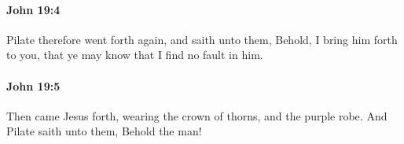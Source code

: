 		\paragraph{John 19:4} %
			\label{JOHN-19-4}

			Pilate therefore went forth again, and saith unto them, Behold, I bring him forth to you, that ye may know that I find no fault in him.

			\begin{framed}
				\scriptsize
				\begin{compactdesc}
					\item[SBLG] 
				\end{compactdesc}
			\end{framed}

		\paragraph{John 19:5} %
			\label{JOHN-19-5}

			Then came Jesus forth, wearing the crown of thorns, and the purple robe. And Pilate saith unto them, Behold the man!

